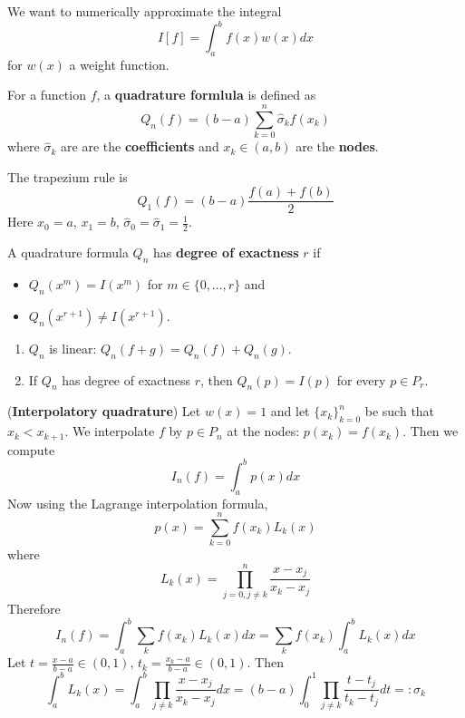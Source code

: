 We want to numerically approximate the integral
\[
	I[f] = \int_{a}^{b} f(x) w(x) dx
\]
for $w(x)$ a weight function.

\begin{definition}
	For a function $f$, a \textbf{quadrature formlula} is defined as
	\[
		Q_n(f) = (b - a) \sum_{k = 0}^n \hat{\sigma}_k f(x_k)
	\]
	where $\hat{\sigma}_k$ are are the \textbf{coefficients} and $x_k \in (a, b)$ are the \textbf{nodes}.
\end{definition}

\begin{example}
	The trapezium rule is
	\[
		Q_1(f) = (b - a) \frac{f(a) + f(b)}{2}
	\]
	Here $x_0 = a$, $x_1 = b$, $\hat{\sigma}_0 = \hat{\sigma}_1 = \frac{1}{2}$.
\end{example}

\begin{definition}
	A quadrature formula $Q_n$ has \textbf{degree of exactness} $r$ if
	\begin{itemize}
		\item $Q_n(x^m) = I(x^m)$ for $m \in \{ 0, \dots, r \}$ and
		\item $Q_n(x^{r + 1}) \ne I(x^{r + 1})$.
	\end{itemize}
\end{definition}

\begin{proposition}
	\hfill
	\begin{enumerate}
		\item $Q_n$ is linear: $Q_n(f + g) = Q_n(f) + Q_n(g)$.
		\item If $Q_n$ has degree of exactness $r$, then $Q_n(p) = I(p)$ for every $p \in P_r$.
	\end{enumerate}
\end{proposition}

\begin{definition}
	(\textbf{Interpolatory quadrature}) Let $w(x) = 1$ and let $\{ x_k \}_{k = 0}^n$ be such that $x_k < x_{k + 1}$. We interpolate $f$ by $p \in P_n$ at the nodes: $p(x_k) = f(x_k)$. Then we compute
	\[
		I_n(f) = \int_{a}^{b} p(x) dx
	\]
	Now using the Lagrange interpolation formula,
	\[
		p(x) = \sum_{k = 0}^{n} f(x_k) L_k(x)
	\]
	where
	\[
		L_k(x) = \prod_{j = 0, j \ne k}^{n} \frac{x - x_j}{x_k - x_j}
	\]
	Therefore
	\[
		I_n(f) = \int_{a}^{b} \sum_k f(x_k) L_k(x) dx = \sum_k f(x_k) \int_{a}^{b} L_k(x) dx
	\]
	Let $t = \frac{x - a}{b - a} \in (0, 1)$, $t_k = \frac{x_k - a}{b - a} \in (0, 1)$. Then
	\[
		\int_{a}^{b} L_k(x) = \int_{a}^{b} \prod_{j \ne k} \frac{x - x_j}{x_k - x_j} dx = (b - a) \int_{0}^{1} \prod_{j \ne k} \frac{t - t_j}{t_k - t_j} dt =: \sigma_k
	\]
\end{definition}


